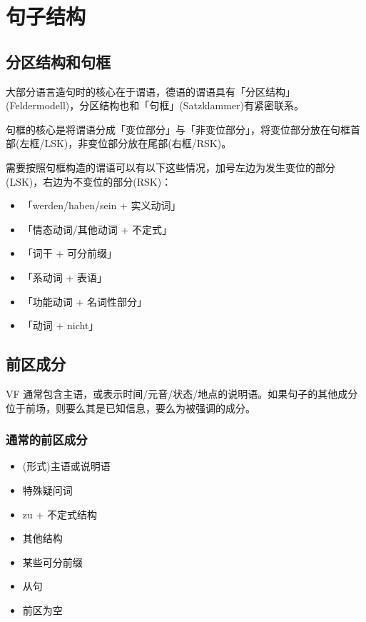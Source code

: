 \section{句子结构}

\subsection{分区结构和句框}
\begin{figure}[H]
    \centering
    
\end{figure}

大部分语言造句时的核心在于谓语，德语的谓语具有「分区结构」(Feldermodell)，分区结构也和「句框」(Satzklammer)有紧密联系。

句框的核心是将谓语分成「变位部分」与「非变位部分」，将变位部分放在句框首部(左框/LSK)，非变位部分放在尾部(右框/RSK)。

需要按照句框构造的谓语可以有以下这些情况，加号左边为发生变位的部分(LSK)，右边为不变位的部分(RSK)：
\begin{itemize}
    \item「werden/haben/sein + 实义动词」
    \item 「情态动词/其他动词 + 不定式」
    \item 「词干 + 可分前缀」
    \item 「系动词 + 表语」
    \item 「功能动词 + 名词性部分」
    \item 「动词 + nicht」
\end{itemize}

\subsection{前区成分}
VF 通常包含主语，或表示时间/元音/状态/地点的说明语。如果句子的其他成分位于前场，则要么其是已知信息，要么为被强调的成分。

\subsubsection{通常的前区成分}

\begin{itemize}
    \item (形式)主语或说明语


    \item 特殊疑问词
    \item zu + 不定式结构
    \item 其他结构
    \item 某些可分前缀
    \item 从句
    \item 前区为空
\end{itemize}

